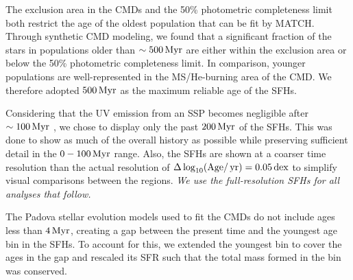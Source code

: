 The exclusion area in the CMDs and the 50\% photometric completeness limit both
restrict the age of the oldest population that can be fit by MATCH. Through
synthetic CMD modeling, we found that a significant fraction of the stars in
populations older than $\sim 500\,\mathrm{Myr}$ are either within the exclusion
area or below the 50\% photometric completeness limit. In comparison, younger
populations are well-represented in the MS/He-burning area of the CMD. We
therefore adopted $500\,\mathrm{Myr}$ as the maximum reliable age of the SFHs.

Considering that the UV emission from an SSP becomes negligible after $\sim
100\,\mathrm{Myr}$ \citep{Gogarten:2009, Leroy:2012}, we chose to display only the
past $200\,\mathrm{Myr}$ of the SFHs. This was done to show as much of the
overall history as possible while preserving sufficient detail in the
$0-100\,\mathrm{Myr}$ range. Also, the SFHs are shown at a coarser time
resolution than the actual resolution of $\Delta \log_{10}(\mathrm{Age}/\,\mathrm{yr}) =
0.05\,\mathrm{dex}$ to simplify visual comparisons between the regions.
\emph{We use the full-resolution SFHs for all analyses that follow.}

The Padova stellar evolution models used to fit the CMDs do not include ages
less than $4\,\mathrm{Myr}$, creating a gap between the present time and the
youngest age bin in the SFHs. To account for this, we extended the youngest bin
to cover the ages in the gap and rescaled its SFR such that the total mass
formed in the bin was conserved.


